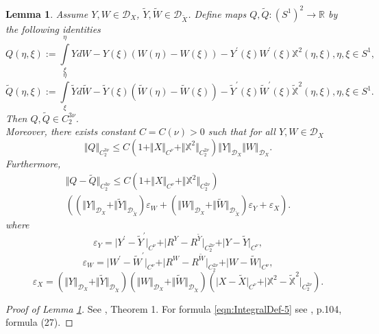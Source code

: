 \documentclass[11pt,a4paper,leqno]{amsart}%
\theoremstyle{plain}
\theoremstyle{remark}
\theoremstyle{plain}
\newtheorem{lemma}[theorem]{Lemma}
\numberwithin{equation}{section}
\newcommand{\eps}{\varepsilon}
\def\Rnu{{\mathbb R}}
\def\intl{\int\limits}
\begin{document}
\begin{lemma}\label{lem:IntegralProp}
Assume $Y,W\in \mathcal{D}_X$, $\tilde{Y},\tilde{W}\in
\mathcal{D}_{\tilde{X}}$. Define maps $Q,\tilde{Q}:(S^1)^2\to\Rnu$ by
the following identities
\begin{equation}
Q(\eta,\xi):=\intl_{\xi}^{\eta}YdW-Y(\xi)(W(\eta)-W(\xi))-Y^\prime(\xi)W^\prime(\xi)\mathbb{X}^2(\eta,\xi),\eta,\xi\in
S^1,\label{eqn:IntegralDef-2}
\end{equation}
\begin{equation}
\tilde{Q}(\eta,\xi):=\intl_{\xi}^{\eta}\tilde{Y}d\tilde{W}-\tilde{Y}(\xi)(\tilde{W}(\eta)-\tilde{W}(\xi))-\tilde{Y}^\prime(\xi)\tilde{W}^\prime(\xi)\tilde{\mathbb{X}}^2(\eta,\xi),\eta,\xi\in
S^1. \label{eqn:IntegralDef-4}
\end{equation}
Then $Q,\tilde{Q}\in C_2^{3\nu}$. \\
Moreover, there exists constant
$C=C(\nu)>0$ such that for all $Y,W\in \mathcal{D}_X$
\begin{equation}
\Vert Q\Vert_{C_2^{3\nu}}\leq
C(1+\Vert X\Vert_{C^{\nu}}+\Vert \mathbb{X}^2\Vert_{C_2^{2\nu}})\Vert Y\Vert_{\mathcal{D}_X}\Vert W\Vert_{\mathcal{D}_X}.\label{eqn:IntegralDef-3}
\end{equation}
Furthermore,
\begin{multline}\label{eqn:IntegralDef-5}
\Vert Q-\tilde{Q}\Vert_{C_2^{3\nu}}\leq
C(1+\Vert X\Vert_{C^{\nu}}+\Vert \mathbb{X}^2\Vert_{C_2^{2\nu}})\\
((\Vert Y\Vert_{\mathcal{D}_X}+\Vert \tilde{Y}\Vert_{\mathcal{D}_{\tilde{X}}})\eps_W+
(\Vert W\Vert_{\mathcal{D}_X}+\Vert \tilde{W}\Vert_{\mathcal{D}_{\tilde{X}}})\eps_Y+\eps_X).
\end{multline}
where
\[
\eps_Y=\vert Y^\prime-\tilde{Y}^\prime\vert_{C^{\nu}}+\vert R^Y-R^{\tilde{Y}}\vert_{C_2^{2\nu}}+\vert Y-\tilde{Y}\vert_{C^{\nu}},
\]
\[
\eps_W=\vert W^\prime-\tilde{W}^\prime\vert_{C^{\nu}}+\vert R^W-R^{\tilde{W}}\vert_{C_2^{2\nu}}+\vert W-\tilde{W}\vert_{C^{\nu}},
\]
\[
\eps_X=(\Vert Y\Vert_{\mathcal{D}_X}+\Vert \tilde{Y}\Vert_{\mathcal{D}_{\tilde{X}}})(\Vert W\Vert_{\mathcal{D}_X}+\Vert \tilde{W}\Vert_{\mathcal{D}_{\tilde{X}}})
(\vert X-\tilde{X}\vert_{C^{\nu}}+\vert \mathbb{X}^2-\mathbb{\tilde{X}}^2\vert_{C_2^{2\nu}}).
\]
\end{lemma}
\begin{proof}[ Proof of Lemma \ref{lem:IntegralProp}]
See \cite{[Gubinelli-2004]}, Theorem 1. For formula
\eqref{eqn:IntegralDef-5} see   \cite{[Gubinelli-2004]}, p.104,
formula (27).
\end{proof}
\end{document}
